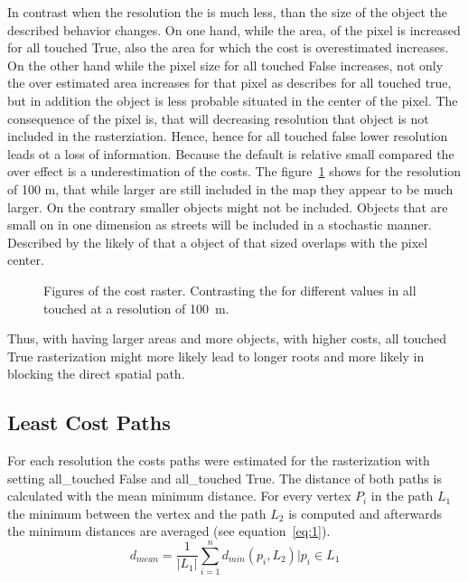 \documentclass[acmtog]{acmart}
\begin{document}
	In contrast when the resolution the is much less, than the size of the object the described behavior changes.
	On one hand, while the area, of the pixel is increased for all touched True, also the area for which the cost is overestimated increases.
	On the other hand while the pixel size for all touched  False increases, not only the over estimated area increases for that pixel as describes for all touched true, but in addition the object is less probable situated in the center of the pixel.
	The consequence of the pixel is, that will decreasing resolution that object is not included in the rasterziation.
	Hence, hence for all touched false lower resolution  leads ot a loss of information.
	Because the default is relative small compared the over effect is a underestimation of the costs.
	The figure~\ref{fig:costs_100m} shows for the resolution of 100 m, that while larger are still included in the map they appear to be much larger.
	On the contrary smaller objects might not be included.
	Objects that are small on in one dimension as streets will be included in a stochastic manner.
	Described by the likely of that a object of that sized overlaps with the pixel center.
	\begin{figure}
		\centering
		
		\qquad
		\caption{Figures of the cost raster. Contrasting the for different values in all touched at a resolution of 100~m.}
		\label{fig:costs_100m}
	\end{figure}
	Thus, with having larger areas and more objects, with higher costs, all touched True rasterization might more likely lead to longer roots and more likely in blocking the  direct spatial path.
	
	\subsection{Least Cost Paths}\label{subsec:least-cost-paths}
	For each resolution the costs paths were estimated for the rasterization with setting all\_touched False
	and all\_touched True.
	The distance of both paths is calculated with the mean minimum distance.
	For every vertex $P_i$ in the path $L_1$ the minimum between the vertex and the path $L_2$
	is computed and afterwards the minimum distances are averaged (see equation~\ref{eq:1}).
	\begin{equation}
		\label{eq:1}
		d_{mean} = \frac{1}{|L_1|} \sum_{i=1}^{n} d_{min}(p_i, L_2) \bigg\vert p_i \in L_1
	\end{equation}
\end{document}
